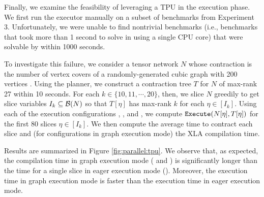 Finally, we examine the feasibility of leveraging a TPU in the execution phase. We first run the  executor manually on a subset of benchmarks from Experiment 3. Unfortunately, we were unable to find nontrivial benchmarks (i.e., benchmarks that took more than 1 second to solve in  using a single CPU core) that were solvable by  within 1000 seconds.



To investigate this failure, we consider a tensor network $N$ whose contraction is the number of vertex covers of a randomly-generated cubic graph with 200 vertices \cite{KCMR18}. 
Using the  planner, we construct a contraction tree $T$ for $N$ of max-rank 27 within 10 seconds. 
For each $k \in \{10, 11, \cdots, 20\}$, then, we slice $N$ greedily to get slice variables $I_k \subseteq \mathcal{B}(N)$ so that $T[\eta]$ has max-rank $k$ for each $\eta \in [I_k]$. 
Using each of the execution configurations , , and , we compute $\texttt{\upshape Execute}(N[\eta], T[\eta])$ for the first 80 slices $\eta \in [I_k]$. 
We then compute the average time to contract each slice and (for configurations in graph execution mode) the XLA compilation time.

Results are summarized in Figure \ref{fig:parallel:tpu}. 
We observe that, as expected, the compilation time in graph execution mode ( and ) is significantly longer than the time for a single slice in eager execution mode (). 
Moreover, the execution time in graph execution mode is faster than the execution time in eager execution mode.

